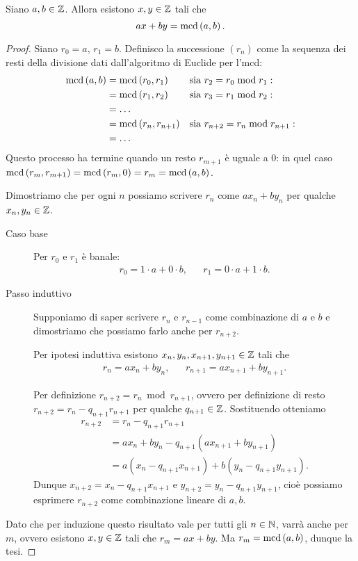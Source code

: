 \begin{theorem}
     \label{bezout}
    Siano $a, b \in \mathbb{Z}$. Allora esistono $x, y \in \mathbb{Z}$ tali che
    \begin{equation}
        ax + by = \operatorname{mcd}\left(a, b\right).
    \end{equation}
\end{theorem}
\begin{proof}
    Siano $r_0 = a$, $r_1 = b$. Definisco la successione $(r_n)$ come la sequenza dei resti della divisione dati dall'algoritmo di Euclide per l'mcd:\begin{align*}
        \operatorname{mcd}\left(a, b\right) &= \operatorname{mcd}\left(r_0, r_1\right) &&\text{sia } r_2 = r_0 \bmod{r_1}: \\
        &= \operatorname{mcd}\left(r_1, r_2\right) &&\text{sia } r_3 = r_1 \bmod{r_2}: \\
        &= \dots\\
        &= \operatorname{mcd}\left(r_n, r_{n+1}\right) &&\text{sia } r_{n+2} = r_n \bmod{r_{n+1}}:\\
        &= \dots
    \end{align*}
    Questo processo ha termine quando un resto $r_{m+1}$ è uguale a $0$: in quel caso $\operatorname{mcd}\left(r_m, r_{m+1}\right) = \operatorname{mcd}\left(r_m, 0\right)= r_m = \operatorname{mcd}\left(a, b\right)$.

    Dimostriamo che per ogni $n$ possiamo scrivere $r_n$ come $ax_n + by_n$ per qualche $x_n, y_n \in \mathbb{Z}$.
    \begin{description}
        \item[Caso base] Per $r_0$ e $r_1$ è banale: \begin{align*}
            r_0 = 1\cdot a + 0 \cdot b, &&r_1 = 0 \cdot a + 1 \cdot b.
        \end{align*}
        \item[Passo induttivo] Supponiamo di saper scrivere $r_n$ e $r_{n-1}$ come combinazione di $a$ e $b$ e dimostriamo che possiamo farlo anche per $r_{n+2}$.
       
        Per ipotesi induttiva esistono $x_n, y_n, x_{n+1}, y_{n+1} \in \mathbb{Z}$ tali che \begin{align*}
            r_n = ax_n + by_n, && r_{n+1} = ax_{n+1} + by_{n+1}.
        \end{align*}

        Per definizione $r_{n+2} = r_n \bmod{r_{n+1}}$, ovvero per definizione di resto $r_{n+2} = r_n - q_{n+1}r_{n+1}$ per qualche $q_{n+1} \in \mathbb{Z}$. Sostituendo otteniamo \begin{align*}
            r_{n+2} &= r_n - q_{n+1}r_{n+1}\\
            &= ax_n + by_n - q_{n+1}(ax_{n+1} + by_{n+1})\\
            &= a(x_n - q_{n+1}x_{n+1}) + b(y_n - q_{n+1}y_{n+1}).
        \end{align*}
        Dunque $x_{n+2} = x_n - q_{n+1}x_{n+1}$ e $y_{n+2} = y_n - q_{n+1}y_{n+1}$, cioè possiamo esprimere $r_{n+2}$ come combinazione lineare di $a, b$.
    \end{description}

    Dato che per induzione questo risultato vale per tutti gli $n \in \mathbb{N}$, varrà anche per $m$, ovvero esistono $x, y \in \mathbb{Z}$ tali che $r_m = ax + by$. Ma $r_m = \operatorname{mcd}\left(a, b\right)$, dunque la tesi.
\end{proof}


